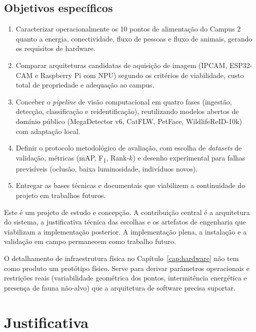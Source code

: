 \subsection*{Objetivos específicos}


\begin{enumerate}
  \item[\textbf{O1.}] Caracterizar operacionalmente os 10 pontos de alimentação do Campus 2 quanto a energia, conectividade, fluxo de pessoas e fluxo de animais, gerando os requisitos de hardware.
  \item[\textbf{O2.}] Comparar arquiteturas candidatas de aquisição de imagem (IPCAM, ESP32-CAM e Raspberry Pi com NPU) segundo os critérios de viabilidade, custo total de propriedade e adequação ao campus.
  \item[\textbf{O3.}] Conceber o \textit{pipeline} de visão computacional em quatro fases (ingestão, detecção, classificação e reidentificação), reutilizando modelos abertos de domínio público (MegaDetector v6, CatFLW, PetFace, WildlifeReID-10k) com adaptação local.
  \item[\textbf{O4.}] Definir o protocolo metodológico de avaliação, com escolha de \textit{datasets} de validação, métricas (mAP, F\textsubscript{1}, Rank-$k$) e desenho experimental para falhas previsíveis (oclusão, baixa luminosidade, indivíduos novos).
  \item[\textbf{O5.}] Entregar as bases técnicas e documentais que viabilizem a continuidade do projeto em trabalhos futuros.
\end{enumerate}


Este é um projeto de estudo e concepção. A contribuição central é a arquitetura do sistema, a justificativa técnica das escolhas e os artefatos de engenharia que viabilizam a implementação posterior. A implementação plena, a instalação e a validação em campo permanecem como trabalho futuro.


O detalhamento de infraestrutura física no Capítulo~\ref{cap:hardware} não tem como produto um protótipo físico. Serve para derivar parâmetros operacionais e restrições reais (variabilidade geométrica dos pontos, intermitência energética e presença de fauna não-alvo) que a arquitetura de software precisa suportar.


\section{Justificativa}
\label{sec:justificativa}


